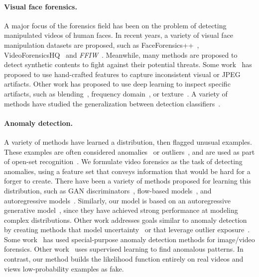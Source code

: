 \documentclass[10pt,twocolumn,letterpaper]{article}
\newcommand{\mypar}[1]{\vspace{-3mm}\paragraph{#1}}
\begin{document}
\mypar{Visual face forensics.} A major focus of the forensics field has been on the problem of detecting manipulated videos of human faces. In recent years, a variety of visual face manipulation datasets are proposed, such as FaceForensics++~\cite{rossler2019faceforensics++}, VideoForensicsHQ~\cite{fox2021videoforensicshq} and \textit{FFIW}~\cite{zhou2021face}. Meanwhile, many methods are proposed to detect synthetic contents to fight against their potential threats. Some work~\cite{bianchi2012image, li2018exposing, guo2022eyes} has proposed to use hand-crafted features to capture inconsistent visual or JPEG artifacts. Other work has proposed to use deep learning to inspect specific artifacts, such as blending~\cite{li2020face}, frequency domain~\cite{qian2020thinking, durall2020watch, frank2020leveraging}, or texture~\cite{liu2020global}. A variety of methods have studied the generalization between detection classifiers~\cite{wang2019cnn,chai2020makes}.
 




















\mypar{Anomaly detection.} 
A variety of methods have learned a distribution, then flagged unusual examples. These examples are often considered anomalies~\cite{zong2018deep, schlegl2017unsupervised, zenati2018adversarially,liu2019generative} or outliers~\cite{sabokrou2018adversarially, pidhorskyi2018generative}, and are used as part of open-set recognition~\cite{kong2021opengan, zhang2020hybrid}. 
We formulate video forensics as the task of detecting anomalies, using a feature set that conveys information that would be hard for a forger to create. There have been a variety of methods proposed for learning this distribution, such as  GAN discriminators~\cite{schlegl2017unsupervised,sabokrou2018adversarially,pidhorskyi2018generative,zenati2018adversarially,liu2019generative,kong2021opengan,zong2018deep,NIPS2014_5ca3e9b1}, flow-based models~\cite{zhang2020hybrid}, and autoregressive models~\cite{song2017pixeldefend}. Similarly, our model is based on an autoregressive generative model~\cite{radford2019language,bengio2000neural}, since they have achieved strong performance at modeling complex distributions. Other work addresses goals similar to anomaly detection by creating methods that model uncertainty~\cite{liang2017enhancing} or that leverage outlier exposure~\cite{dhamija2018reducing,ruff2019deep,hendrycks2018deep}. Some work~\cite{huh2018fighting,cozzolino2016single,kalyan2018satellite,d2017autoencoder,bondi2017tampering,khalid2020oc,perez2019deep} has used special-purpose anomaly detection methods for image/video forensics. Other work~\cite{fei2022learning,zhao2021learning,wu2019mantra,hu2021dynamic} uses supervised learning to find anomalous patterns. In contrast, our method builds the likelihood function entirely on real videos and views low-probability examples as fake. 
\end{document}
